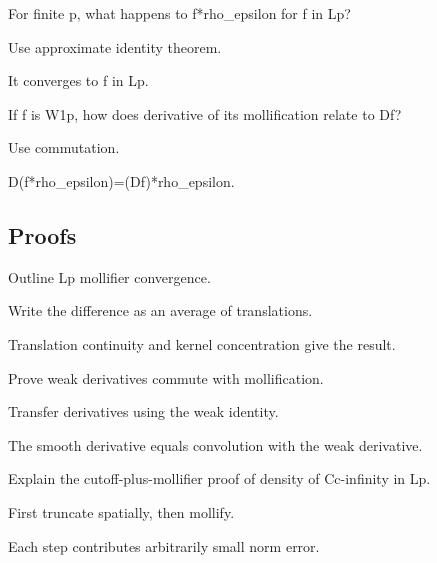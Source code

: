 \begin{exercise}[Lp convergence]\label{exr:iii22-expand-04}
For finite p, what happens to f*rho\_epsilon for f in Lp?
\end{exercise}
\begin{hint}
Use approximate identity theorem.
\end{hint}
\begin{solution}
It converges to f in Lp.
\end{solution}

\begin{exercise}\label{exr:iii22-expand-05}
If f is W1p, how does derivative of its mollification relate to Df?
\end{exercise}
\begin{hint}
Use commutation.
\end{hint}
\begin{solution}
D(f*rho\_epsilon)=(Df)*rho\_epsilon.
\end{solution}

\subsection*{Proofs}

\begin{exercise}\label{exr:iii22-expand-06}
Outline Lp mollifier convergence.
\end{exercise}
\begin{hint}
Write the difference as an average of translations.
\end{hint}
\begin{solution}
Translation continuity and kernel concentration give the result.
\end{solution}

\begin{exercise}\label{exr:iii22-expand-07}
Prove weak derivatives commute with mollification.
\end{exercise}
\begin{hint}
Transfer derivatives using the weak identity.
\end{hint}
\begin{solution}
The smooth derivative equals convolution with the weak derivative.
\end{solution}

\begin{exercise}[Density]\label{exr:iii22-expand-08}
Explain the cutoff-plus-mollifier proof of density of Cc-infinity in Lp.
\end{exercise}
\begin{hint}
First truncate spatially, then mollify.
\end{hint}
\begin{solution}
Each step contributes arbitrarily small norm error.
\end{solution}

